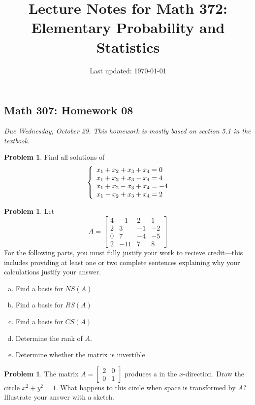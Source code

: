 \documentclass[10pt]{article}
\title{Lecture Notes for Math 372: \\Elementary Probability and Statistics}
\date{Last updated: \today}
\theoremstyle{definition}
\newtheorem{problem}[theorem]{Problem}
\newcommand{\1}[1]{\textbf{1}_{\left[#1\right]}} %
\newcommand{\dempfcolor}[1]{{\color{RoyalBlue}#1}}
\newcommand{\demph}[1]{\dempfcolor{{\sl #1}}}
\begin{document}
\begin{center}
  \section*{Math 307: Homework 08}
  \textit{Due Wednesday, October 29. This homework is mostly based on section
    5.1 in the textbook.}
\end{center}

\begin{problem}
  Find all solutions of
  \begin{equation*}
    \left\{ \begin{array}{l@{}l}
        x_{1}+x_{2}+x_{3}+x_{4}=0\\
        x_{1}+x_{2}+x_{3}-x_{4}=4\\
        x_{1}+x_{2}-x_{3}+x_{4}=-4\\
        x_{1}-x_{2}+x_{3}+x_{4}=2\\
      \end{array}\right.
  \end{equation*}
\end{problem}


\begin{problem}
  Let
  \begin{equation*}
    A=
    \begin{bmatrix}
      4&-1&2&1\\
      2&3&-1&-2\\
      0&7&-4&-5\\
      2&-11&7&8
    \end{bmatrix}
  \end{equation*}
  For the following parts, you must fully justify your work to recieve
  credit---this includes providing at least one or two complete sentences
  explaining why your calculations justify your answer.
  \begin{enumerate}[(a)]
    \item Find a basis for $NS(A)$
    \item Find a basis for $RS(A)$
    \item Find a basis for $CS(A)$
    \item Determine the rank of $A$.
    \item Determine whether the matrix is invertible
  \end{enumerate}
\end{problem}

\begin{problem}
  The matrix $A=
  \begin{bmatrix}
    2&0\\
    0&1
  \end{bmatrix}
  $ produces a \demph{stretching} in the $x$-direction. Draw the circle
  $x^{2}+y^{2}=1$. What happens to this circle when space is transformed by
  $A$? Illustrate your answer with a sketch.
\end{problem}
\end{document}
